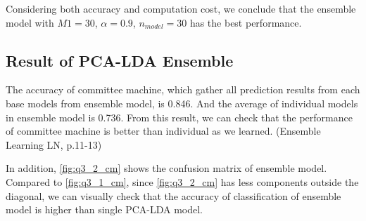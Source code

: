 Considering both accuracy and computation cost, we conclude that the ensemble model with $M1=30$, $\alpha=0.9$, $n_{model}=30$ has the best performance.



\subsection{Result of PCA-LDA Ensemble}
The accuracy of committee machine, which gather all prediction results from each base models from ensemble model, is 0.846. And the average of individual models in ensemble model is 0.736. From this result, we can check that the performance of committee machine is better than individual as we learned. (Ensemble Learning LN, p.11-13)

In addition, \cref{fig:q3_2_cm} shows the confusion matrix of ensemble model. Compared to \cref{fig:q3_1_cm}, since \cref{fig:q3_2_cm} has less components outside the diagonal, we can visually check that the accuracy of classification of ensemble model is higher than single PCA-LDA model.
